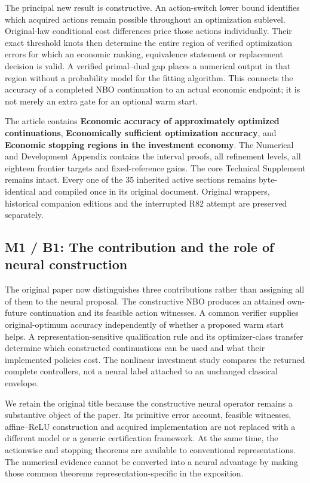 \documentclass[ecta,nameyear,draft]{econsocart}
\begin{document}
The principal new result is constructive. An action-switch lower bound
identifies which acquired actions remain possible throughout an
optimization sublevel. Original-law conditional cost differences price
those actions individually. Their exact threshold knots then determine
the entire region of verified optimization errors for which an economic
ranking, equivalence statement or replacement decision is valid. A
verified primal--dual gap places a numerical output in that region
without a probability model for the fitting algorithm. This connects the
accuracy of a completed NBO continuation to an actual economic endpoint;
it is not merely an extra gate for an optional warm start.

The article contains \textbf{Economic accuracy of approximately
optimized continuations}, \textbf{Economically sufficient optimization
accuracy}, and \textbf{Economic stopping regions in the investment
economy}. The Numerical and Development Appendix contains the interval
proofs, all refinement levels, all eighteen frontier targets and
fixed-reference gains. The core Technical Supplement remains intact.
Every one of the 35 inherited active sections remains byte-identical and
compiled once in its original document. Original wrappers, historical
companion editions and the interrupted R82 attempt are preserved
separately.

\hypertarget{m1-b1-the-contribution-and-the-role-of-neural-construction}{%
\subsection{M1 / B1: The contribution and the role of neural
construction}\label{m1-b1-the-contribution-and-the-role-of-neural-construction}}

The original paper now distinguishes three contributions rather than
assigning all of them to the neural proposal. The constructive NBO
produces an attained own-future continuation and its feasible action
witnesses. A common verifier supplies original-optimum accuracy
independently of whether a proposed warm start helps. A
representation-sensitive qualification rule and its optimizer-class
transfer determine which constructed continuations can be used and what
their implemented policies cost. The nonlinear investment study compares
the returned complete controllers, not a neural label attached to an
unchanged classical envelope.

We retain the original title because the constructive neural operator
remains a substantive object of the paper. Its primitive error account,
feasible witnesses, affine--ReLU construction and acquired
implementation are not replaced with a different model or a generic
certification framework. At the same time, the actionwise and stopping
theorems are available to conventional representations. The numerical
evidence cannot be converted into a neural advantage by making those
common theorems representation-specific in the exposition.
\end{document}
